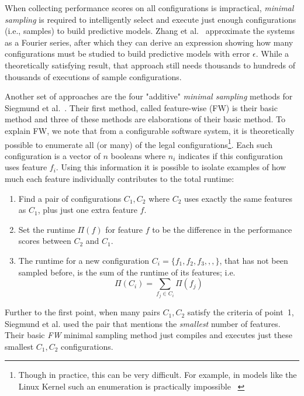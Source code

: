 \documentclass{sig-alternative}
\newcommand{\be}{\begin{enumerate}}
\newcommand{\ee}{\end{enumerate}}
\begin{document}
 When collecting performance scores on all configurations is impractical,  {\em minimal sampling } 
 is required to intelligently select and execute   just enough configurations (i.e., samples) to build
 predictive models.
 Zhang et al.~\cite{zhang2015performance} approximate the
 systems as a Fourier series, after which they can derive an expression showing how many configurations must be studied
 to build predictive models with error $\epsilon$. While a theoretically satisfying result, that approach still needs thousands to hundreds of thousands of executions of sample
 configurations.  

Another set of approaches are the four "additive" {\em minimal sampling} methods for Siegmund et al.~\cite{siegmund2012predicting}.
Their first method, called feature-wise (FW) is their basic method and 
three of these methods are    elaborations of their basic method.
To explain FW, we note that from a configurable software system, it is theoretically possible to enumerate all (or many) of the legal configurations\footnote{Though in practice, this can be very difficult. For example, in models like the Linux Kernel such an enumeration is practically impossible ~\cite{sayyad13b}}. 
Each such
configuration is a vector of $n$ booleans where $n_i$ indicates if this configuration uses feature $f_i$.
Using this information it  is possible to isolate examples of how much each feature individually contributes to the total runtime:
\be
\item Find a pair of  configurations $C_1,C_2$  where $C_2$ uses exactly the same features as $C_1$, plus just one  extra feature $f$.
\item Set the runtime $\Pi(f)$ for feature $f$ to be the difference in the performance scores between $C_2$ and $C_1$.
\item The runtime  for a new configuration  $C_i=\{f_1,f_2,f_3,,,\}$, that has not been sampled before,  is the sum of the runtime of its features; i.e.
\begin{equation}
  \Pi(C_i) = \sum_{f_j \in C_i}\Pi(f_j)  
\end{equation}
\ee

Further to the first point, when many pairs $C_1,C_2$ satisfy the criteria of point~1, Siegmund et al. used the 
pair that mentions the {\em smallest} number of features. Their basic {\em FW} minimal sampling method 
just compiles and executes just these smallest $C_1,C_2$ configurations. 
\end{document}

